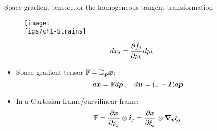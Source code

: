 \begin{frame}{Space gradient tensor}{...or the homogeneous tangent transformation}

\begin{figure}
\centering\texttt{[image: \\figs/ch1-Strains]}
\end{figure}
\begin{displaymath}
dx_j=\frac{\partial f_j}{\partial p_k}dp_k
\end{displaymath}
\begin{itemize}
\item Space gradient tensor ${\mathbb F}={\mathbb D}_{\boldsymbol{p}}{\boldsymbol{x}}$:
\begin{displaymath}
d{\boldsymbol{x}}={\mathbb F}d{\boldsymbol{p}}\,,\quad d{\boldsymbol{u}}=({\mathbb F}-{\boldsymbol I})d{\boldsymbol{p}}
\end{displaymath}
\item In a Cartesian frame/curvilinear frame:
\begin{displaymath}
{\mathbb F}=\frac{\partial{\boldsymbol{x}}}{\partial p_j}\otimes{\boldsymbol{i}}_j=\frac{\partial{\boldsymbol{x}}}{\partial\xi_j}\otimes{\boldsymbol\nabla}_{\boldsymbol{p}}\xi_j
\end{displaymath}
\end{itemize}

\end{frame}

